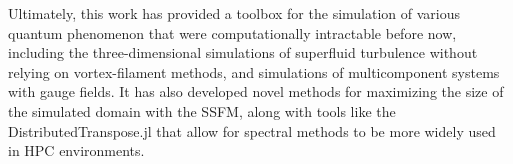 Ultimately, this work has provided a toolbox for the simulation of various quantum phenomenon that were computationally intractable before now, including the three-dimensional simulations of superfluid turbulence without relying on vortex-filament methods, and simulations of multicomponent systems with gauge fields.
It has also developed novel methods for maximizing the size of the simulated domain with the SSFM, along with tools like the DistributedTranspose.jl that allow for spectral methods to be more widely used in HPC environments.
